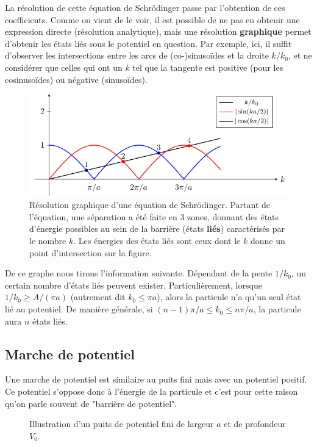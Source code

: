\documentclass[12pt, a4paper]{book}
\begin{document}
La résolution de cette équation de Schrödinger passe par l'obtention de ces coefficients. Comme on vient de le voir, il est possible de ne pas en obtenir une expression directe (résolution analytique), mais une résolution \textbf{graphique} permet d'obtenir les états liés sous le potentiel en question. Par exemple, ici, il suffit d'observer les intersections entre les arcs de (co-)sinusoïdes et la droite $k/k_0$, et ne considérer que celles qui ont un $k$ tel que la tangente est positive (pour les cosinusoïdes) ou négative (sinusoïdes). 

\begin{figure}[h]
  \centering
  \includegraphics{images/chap2-puits_fini_solutions.pdf}
  \caption{Résolution graphique d'une équation de Schrödinger. Partant de l'équation, une séparation a été faite en 3 zones, donnant des états d'énergie possibles au sein de la barrière (états \textbf{liés}) caractérisés par le nombre $k$. Les énergies des états liés sont ceux dont le $k$ donne un point d'intersection sur la figure.}
\end{figure}

De ce graphe nous tirons l'information suivante.
Dépendant de la pente $1/k_0$, un certain nombre d'états liés peuvent exister. Particulièrement, lorsque $1/k_0  \geq A/(\pi a)$ (autrement dit $k_0 \leq \pi a$), alors la particule n'a qu'un seul état lié au potentiel. De manière générale, si $(n-1)\pi/a \leq k_0 \leq n\pi/a$, la particule aura $n$ états liés.



\subsection{Marche de potentiel}
Une marche de potentiel est similaire au puits fini mais avec un potentiel positif. Ce potentiel s'oppose donc à l'énergie de la particule et c'est pour cette raison qu'on parle souvent de "barrière de potentiel".

\begin{figure}[h]
  \centering
  \scalebox{1.2}{}
  \caption{Illustration d'un puits de potentiel fini de largeur $a$ et de profondeur $V_0$.}
  \label{fig:chap2-marche_potentiel}
\end{figure}
\end{document}
